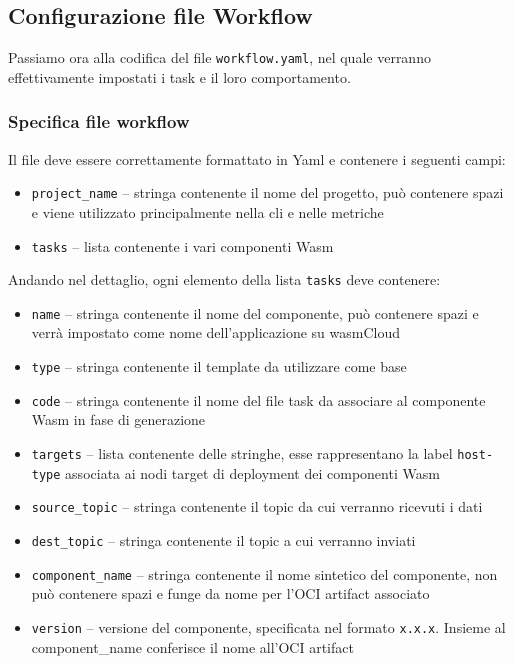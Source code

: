 \subsection{Configurazione file Workflow}

Passiamo ora alla codifica del file \texttt{workflow.yaml}, nel quale verranno effettivamente impostati i task e il loro comportamento. 

\subsubsection{Specifica file workflow}

Il file deve essere correttamente formattato in Yaml e contenere i seguenti campi:
\begin{itemize}
    \item \texttt{project\_name} -- stringa contenente il nome del progetto, può contenere spazi e viene utilizzato principalmente nella cli e nelle metriche
    \item \texttt{tasks} -- lista contenente i vari componenti Wasm
\end{itemize}

Andando nel dettaglio, ogni elemento della lista \texttt{tasks} deve contenere:
\begin{itemize}
    \item \texttt{name} --  stringa contenente il nome del componente, può contenere spazi e verrà impostato come nome dell'applicazione su wasmCloud
    \item \texttt{type} -- stringa contenente il template da utilizzare come base
    \item \texttt{code} -- stringa contenente il nome del file task da associare al componente Wasm in fase di generazione
    \item \texttt{targets} -- lista contenente delle stringhe, esse rappresentano la label \texttt{host-type} associata ai nodi target di deployment dei componenti Wasm
    \item \texttt{source\_topic} -- stringa contenente il topic da cui verranno ricevuti i dati
    \item \texttt{dest\_topic} -- stringa contenente il topic a cui verranno inviati
    \item \texttt{component\_name} -- stringa contenente il nome sintetico del componente, non può contenere spazi e funge da nome per l'OCI artifact associato
    \item \texttt{version} -- versione del componente, specificata nel formato \texttt{x.x.x}. Insieme al component\_name conferisce il nome all'OCI artifact
    
\end{itemize}

